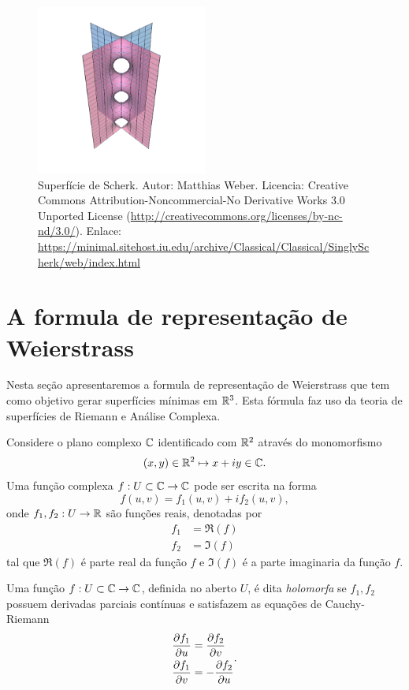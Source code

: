 \begin{figure}
	\centering
	\includegraphics[width=0.5\textwidth]{images/scherk}
	\caption{Superfície de Scherk. Autor: Matthias Weber. Licencia: Creative Commons Attribution-Noncommercial-No Derivative Works 3.0 Unported License (\url{http://creativecommons.org/licenses/by-nc-nd/3.0/}). Enlace: \url{https://minimal.sitehost.iu.edu/archive/Classical/Classical/SinglyScherk/web/index.html}}
\end{figure}

\section{A formula de representação de Weierstrass}
Nesta seção apresentaremos a formula de representação de Weierstrass que tem como objetivo gerar superfícies mínimas em $\mathbb{R}^3$. Esta fórmula faz uso da teoria de superfícies de Riemann e Análise Complexa.

Considere o plano complexo $\mathbb{C}$ identificado com $\mathbb{R}^2$ através do monomorfismo
\begin{equation*}
(x,y) \in \mathbb{R}^2 \mapsto x + iy \in \mathbb{C}.
\end{equation*}
Uma função complexa $f: U \subset \mathbb{C} \rightarrow \mathbb{C}$ pode ser escrita na forma
\begin{equation*}
f(u,v) = f_1(u,v) + i f_2(u,v),
\end{equation*}
onde $f_1, f_2: U \rightarrow \mathbb{R}$ são funções reais, denotadas por
\begin{align*}
f_1 &= \Re(f)\\
f_2 &= \Im(f)
\end{align*}
tal que $\Re(f)$ é parte real da função $f$ e $\Im(f)$ é a parte imaginaria da função $f$.
\begin{definicao}
	Uma função $f: U \subset \mathbb{C} \rightarrow \mathbb{C}$, definida no aberto $U$, é dita \emph{holomorfa} se $f_1, f_2$ possuem derivadas parciais contínuas e satisfazem as equações de Cauchy-Riemann
	\begin{equation*}
		\begin{split}
		\frac{\partial f_1}{\partial u} &= \frac{\partial f_2}{\partial v}\\
		\frac{\partial f_1}{\partial v} &= - \frac{\partial f_2}{\partial u}
		\end{split}.
	\end{equation*}

\end{definicao}

